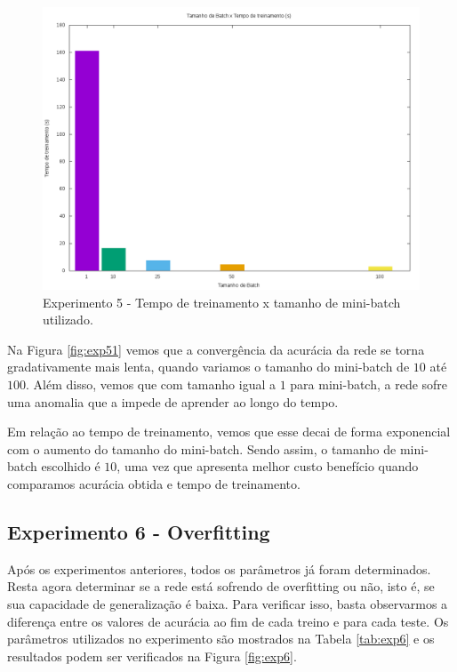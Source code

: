 \documentclass[12pt]{article}
\begin{document}
\begin{figure}[h]
  \centering
  \includegraphics[width=1\textwidth]{../tests/5-batch/graph2.png}
  \caption{Experimento 5 - Tempo de treinamento x tamanho de mini-batch
  utilizado.}
  \label{fig:exp52}
\end{figure}

Na Figura \ref{fig:exp51} vemos que a convergência da acurácia da rede
se torna gradativamente mais lenta, quando variamos o tamanho do mini-batch
de $ 10 $ até $ 100 $. Além disso, vemos que com tamanho igual a $ 1 $
para mini-batch, a rede sofre uma anomalia que a impede de aprender ao longo
do tempo.

Em relação ao tempo de treinamento, vemos que esse decai de forma exponencial
com o aumento do tamanho do mini-batch. Sendo assim, o tamanho de mini-batch
escolhido é $ 10 $, uma vez que apresenta melhor custo benefício quando
comparamos acurácia obtida e tempo de treinamento.

\subsection{Experimento 6 - Overfitting}

Após os experimentos anteriores, todos os parâmetros já foram determinados.
Resta agora determinar se a rede está sofrendo de overfitting ou não, isto é,
se sua capacidade de generalização é baixa. Para verificar isso, basta
observarmos a diferença entre os valores de acurácia ao fim de cada treino
e para cada teste. Os parâmetros utilizados no experimento são mostrados
na Tabela \ref{tab:exp6} e os resultados podem ser verificados na Figura
\ref{fig:exp6}.
\end{document}
